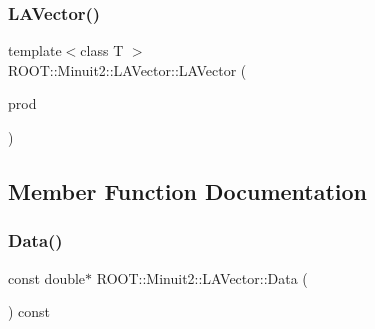\subsubsection{\texorpdfstring{LAVector()}{LAVector()}\hspace{0.1cm}{\footnotesize\ttfamily [24/24]}}
{\footnotesize\ttfamily template$<$class T $>$ \\
R\+O\+O\+T\+::\+Minuit2\+::\+L\+A\+Vector\+::\+L\+A\+Vector (\begin{DoxyParamCaption}\item[{const \mbox{\hyperlink{classROOT_1_1Minuit2_1_1ABObj}{A\+B\+Obj}}$<$ \mbox{\hyperlink{classROOT_1_1Minuit2_1_1vec}{vec}}, \mbox{\hyperlink{classROOT_1_1Minuit2_1_1ABSum}{A\+B\+Sum}}$<$ \mbox{\hyperlink{classROOT_1_1Minuit2_1_1ABObj}{A\+B\+Obj}}$<$ \mbox{\hyperlink{classROOT_1_1Minuit2_1_1vec}{vec}}, \mbox{\hyperlink{classROOT_1_1Minuit2_1_1ABProd}{A\+B\+Prod}}$<$ \mbox{\hyperlink{classROOT_1_1Minuit2_1_1ABObj}{A\+B\+Obj}}$<$ \mbox{\hyperlink{classROOT_1_1Minuit2_1_1sym}{sym}}, \mbox{\hyperlink{classROOT_1_1Minuit2_1_1LASymMatrix}{L\+A\+Sym\+Matrix}}, T $>$, \mbox{\hyperlink{classROOT_1_1Minuit2_1_1ABObj}{A\+B\+Obj}}$<$ \mbox{\hyperlink{classROOT_1_1Minuit2_1_1vec}{vec}}, \mbox{\hyperlink{classROOT_1_1Minuit2_1_1LAVector}{L\+A\+Vector}}, T $>$ $>$, T $>$, \mbox{\hyperlink{classROOT_1_1Minuit2_1_1ABObj}{A\+B\+Obj}}$<$ \mbox{\hyperlink{classROOT_1_1Minuit2_1_1vec}{vec}}, \mbox{\hyperlink{classROOT_1_1Minuit2_1_1LAVector}{L\+A\+Vector}}, T $>$ $>$, T $>$ \&}]{prod }\end{DoxyParamCaption})\hspace{0.3cm}{\ttfamily [inline]}}



\subsection{Member Function Documentation}
\mbox{\label{classROOT_1_1Minuit2_1_1LAVector_a22e21b176e4d63740045edb4c12fe0a3}} 
\subsubsection{\texorpdfstring{Data()}{Data()}\hspace{0.1cm}{\footnotesize\ttfamily [1/6]}}
{\footnotesize\ttfamily const double$\ast$ R\+O\+O\+T\+::\+Minuit2\+::\+L\+A\+Vector\+::\+Data (\begin{DoxyParamCaption}{ }\end{DoxyParamCaption}) const\hspace{0.3cm}{\ttfamily [inline]}}

